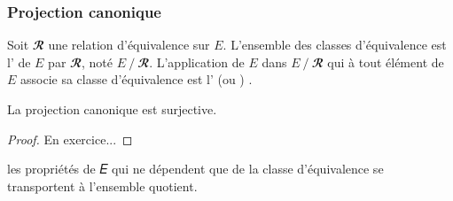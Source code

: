 %
\subsubsection{Projection canonique}
\begin{definition}
Soit \(𝓡\) une relation d'équivalence sur \(𝐸\). L'ensemble des classes d'équivalence est
l' de \(𝐸\) par \(𝓡\), noté \(𝐸⁄𝓡\).
L'application de \(𝐸\) dans \(𝐸⁄𝓡\) qui à tout élément de \(𝐸\)
associe sa classe d'équivalence est l' (ou )
.
\end{definition}
\begin{theorem}
La projection canonique est surjective.
\end{theorem}
\begin{proof}
En exercice...
\end{proof}
\begin{remark}
les propriétés de 𝐸 qui ne dépendent que de la classe d'équivalence se
transportent à l'ensemble quotient.
\end{remark}
